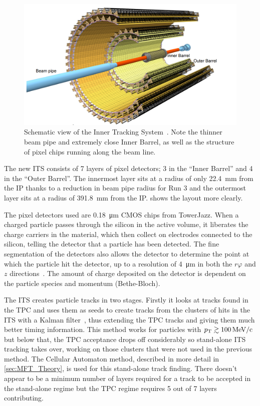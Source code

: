 \begin{figure}[h]
    \begin{center}
        \includegraphics[width=.8\textwidth]{Figs/ITS_Schematic.png}
        \caption[Schematic view of the Inner Tracking System]{Schematic view of the Inner Tracking System~\cite{ITS_Upgrade_TDR}. Note the thinner beam pipe and extremely close Inner Barrel, as well as the structure of pixel chips running along the beam line.}
        \label{fig:ITS_Schematic}
    \end{center}
\end{figure}

The new ITS consists of 7 layers of pixel detectors; 3 in the ``Inner Barrel'' and 4 in the ``Outer Barrel''. The innermost layer sits at a radius of only \SI{22.4}{\milli\metre} from the IP thanks to a reduction in beam pipe radius for Run 3 and the outermost layer sits at a radius of \SI{391.8}{\milli\metre} from the IP.  shows the layout more clearly. 

The pixel detectors used are \SI{0.18}{\micro\metre} CMOS chips from TowerJazz. When a charged particle passes through the silicon in the active volume, it liberates the charge carriers in the material, which then collect on electrodes connected to the silicon, telling the detector that a particle has been detected. The fine segmentation of the detectors also allows the detector to determine the point at which the particle hit the detector, up to a resolution of \SI{4}{\micro\metre} in both the $r\varphi$ and $z$ directions~\cite{ITS_Upgrade_TDR}. The amount of charge deposited on the detector is dependent on the particle species and momentum (Bethe-Bloch). 

The ITS creates particle tracks in two stages. Firstly it looks at tracks found in the TPC and uses them as seeds to create tracks from the clusters of hits in the ITS with a Kalman filter~\cite{Kalman}, thus extending the TPC tracks and giving them much better timing information. This method works for particles with $p_\mathrm{T}\gtrsim\SI{100}{\mega\electronvolt\per c}$ but below that, the TPC acceptance drops off considerably so stand-alone ITS tracking takes over, working on those clusters that were not used in the previous method. The Cellular Automaton method, described in more detail in \cref{sec:MFT_Theory}, is used for this stand-alone track finding. There doesn't appear to be a minimum number of layers required for a track to be accepted in the stand-alone regime but the TPC regime requires 5 out of 7 layers contributing.

